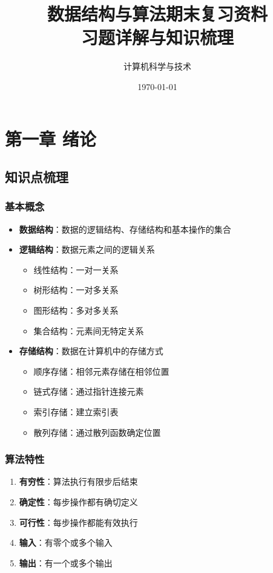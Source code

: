 \documentclass[12pt,a4paper]{amsart}
\title{\textbf{数据结构与算法期末复习资料\\习题详解与知识梳理}}
\author{计算机科学与技术}
\date{\today}
\begin{document}
\maketitle

\tableofcontents


\section{第一章 绪论}

\subsection{知识点梳理}

\subsubsection{基本概念}
\begin{itemize}
\item \textbf{数据结构}：数据的逻辑结构、存储结构和基本操作的集合
\item \textbf{逻辑结构}：数据元素之间的逻辑关系
\begin{itemize}
\item 线性结构：一对一关系
\item 树形结构：一对多关系
\item 图形结构：多对多关系
\item 集合结构：元素间无特定关系
\end{itemize}
\item \textbf{存储结构}：数据在计算机中的存储方式
\begin{itemize}
\item 顺序存储：相邻元素存储在相邻位置
\item 链式存储：通过指针连接元素
\item 索引存储：建立索引表
\item 散列存储：通过散列函数确定位置
\end{itemize}
\end{itemize}

\subsubsection{算法特性}
\begin{enumerate}
\item \textbf{有穷性}：算法执行有限步后结束
\item \textbf{确定性}：每步操作都有确切定义
\item \textbf{可行性}：每步操作都能有效执行
\item \textbf{输入}：有零个或多个输入
\item \textbf{输出}：有一个或多个输出
\end{enumerate}
\end{document}
